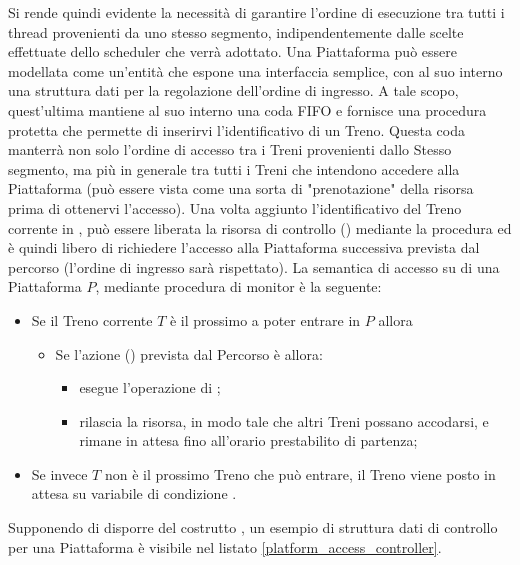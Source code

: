 \begin{description}
		Si rende quindi evidente la necessità di garantire l'ordine di esecuzione tra tutti i thread provenienti da uno stesso segmento, indipendentemente dalle scelte effettuate dello scheduler che verrà adottato.
		Una Piattaforma può essere modellata come un'entità che espone una interfaccia semplice, con al suo interno una struttura dati  per la regolazione dell'ordine di ingresso. A tale scopo, quest'ultima mantiene al suo interno una coda FIFO  e fornisce una procedura protetta  che permette di inserirvi l'identificativo di un Treno. Questa coda manterrà non solo l'ordine di accesso tra i Treni provenienti dallo Stesso segmento, ma più in generale tra tutti i Treni che intendono accedere alla Piattaforma (può essere vista come una sorta di "prenotazione" della risorsa prima di ottenervi l'accesso). 
		Una volta aggiunto l'identificativo del Treno corrente in , può essere liberata la risorsa di controllo () mediante la procedura  ed è quindi libero di richiedere l'accesso alla Piattaforma successiva prevista dal percorso (l'ordine di ingresso sarà rispettato). La semantica di accesso su di una Piattaforma $P$, mediante procedura di monitor  è la seguente:
		\begin{itemize}
			\item Se il Treno corrente $T$ è il prossimo a poter entrare in $P$ allora 
				\begin{itemize}
					\item Se l'azione () prevista dal Percorso è  allora:
						\begin{itemize}
							\item esegue l'operazione di ;
							\item rilascia la risorsa, in modo tale che altri Treni possano accodarsi, e rimane in attesa fino all'orario prestabilito di partenza;
						\end{itemize}
				\end{itemize} 
			\item Se invece $T$ non è il prossimo Treno che può entrare, il Treno viene posto in attesa su variabile di condizione .
		\end{itemize}

Supponendo di disporre del costrutto , un esempio di struttura dati di controllo per una Piattaforma è visibile nel listato \ref{platform_access_controller}.


\end{description}
